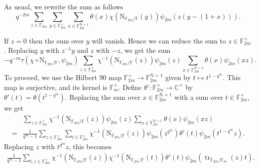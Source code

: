 \documentclass[12pt, reqno]{amsart}
\theoremstyle{definition}
\theoremstyle{definition}
\theoremstyle{definition}
\newcommand{\cComplex}{\mathbb{C}}
\newcommand{\multiplicativegroup}[1]{#1^{\times}}
\newcommand{\fieldCharacter}{\psi}
\newcommand{\trace}{\operatorname{tr}}
\newcommand{\aFieldNorm}{\mathrm{N}}
\newcommand{\finiteField}{\mathbb{F}}
\newcommand{\finiteFieldExtension}[1]{\finiteField_{#1}}
\newcommand{\NormOneGroup}[1]{\finiteFieldExtension{#1}^{\aFieldNorm = 1}}
\newcommand{\GaussSumSingleCharacter}[2]{\tau\left(#1, #2\right)}
\begin{document}
As usual, we rewrite the sum as follows
$$q^{-2m} \sum_{z \in \finiteFieldExtension{2m}} \sum_{y \in \multiplicativegroup{\finiteFieldExtension{2m}}} \sum_{x \in \NormOneGroup{2m}} \theta \left(x\right) \chi\left(\aFieldNorm_{\finiteFieldExtension{2m} \slash \finiteField}\left(y\right)\right) \fieldCharacter_{2m}\left(z\left(y-\left(1+x\right)\right)\right).$$

If $z=0$ then the sum over $y$ will vanish. Hence we can reduce the sum to $z \in \multiplicativegroup{\finiteFieldExtension{2m}}$. Replacing $y$ with $z^{-1} y$ and $z$ with $-z$, we get the sum
$$-q^{-m} \GaussSumSingleCharacter{\chi \circ \aFieldNorm_{\finiteFieldExtension{2m} \slash \finiteField}}{\fieldCharacter_{2m}} \sum_{z \in \multiplicativegroup{\finiteFieldExtension{2m}}} \chi^{-1}\left(\aFieldNorm_{\finiteFieldExtension{2m} \slash \finiteField}\left(z\right)\right) \fieldCharacter_{2m}\left(z\right)  \sum_{x \in \NormOneGroup{2m}} \theta \left(x\right) \fieldCharacter_{2m}\left(xz\right).$$
To proceed, we use the Hilbert 90 map $\multiplicativegroup{\finiteFieldExtension{2m}} \to \NormOneGroup{2m}$ given by $t \mapsto t^{1 - q^m}$. This map is surjective, and its kernel is $\multiplicativegroup{\finiteFieldExtension{m}}$. Define $\theta' \colon \multiplicativegroup{\finiteFieldExtension{2m}} \to \multiplicativegroup{\cComplex}$ by $\theta'\left(t\right) = \theta\left(t^{1-q^m}\right)$. Replacing the sum over $x \in \NormOneGroup{2m}$ with a sum over $t \in \multiplicativegroup{\finiteFieldExtension{2m}}$, we get \begin{align*}
	& \sum_{z \in \multiplicativegroup{\finiteFieldExtension{2m}}} \chi^{-1}\left(\aFieldNorm_{\finiteFieldExtension{2m} \slash \finiteField}\left(z\right)\right) \fieldCharacter_{2m}\left(z\right) \sum_{x \in \NormOneGroup{2m}} \theta \left(x\right) \fieldCharacter_{2m}\left(xz\right) \\
	= & \frac{1}{q^m-1}\sum_{z \in \multiplicativegroup{\finiteFieldExtension{2m}}} \sum_{t \in \multiplicativegroup{\finiteFieldExtension{2m}}} \chi^{-1}\left(\aFieldNorm_{\finiteFieldExtension{2m} \slash \finiteField}\left(z\right)\right) \fieldCharacter_{2m}\left(z^{q^m}\right) \theta' \left(t\right) \fieldCharacter_{2m}\left(t^{1-q^m} z\right).
\end{align*}
Replacing $z$ with $t^{q^m} z$, this becomes
\begin{align*}
	\frac{1}{q^m-1}\sum_{t,z \in \multiplicativegroup{\finiteFieldExtension{2m}}} \chi^{-1}\left(\aFieldNorm_{\finiteFieldExtension{2m} \slash \finiteField}\left(z\right)\right) \chi^{-1}\left(\aFieldNorm_{\finiteFieldExtension{2m} \slash \finiteField}\left(t\right)\right) \theta' \left(t\right) \fieldCharacter_{2m}\left(\trace_{\finiteFieldExtension{2m} \slash \finiteFieldExtension{m}}\left(z\right) t\right).
\end{align*}
\end{document}
